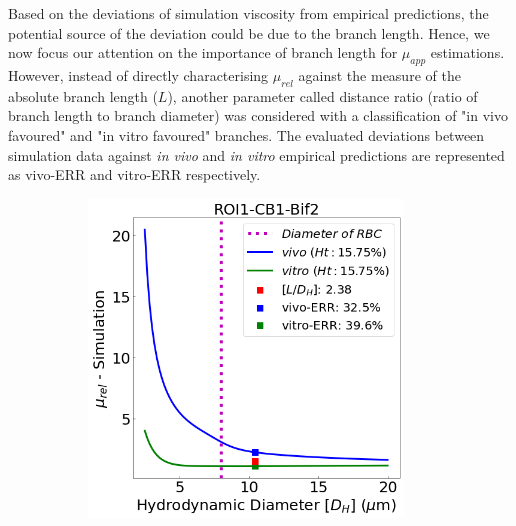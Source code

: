 \noindent Based on the deviations of simulation viscosity from empirical predictions, the potential source of the deviation could be due to the branch length. Hence, we now focus our attention on the importance of branch length for $\mu_{app}$ estimations. However, instead of directly characterising $\mu_{rel}$ against the measure of the absolute branch length ($L$), another parameter called distance ratio (ratio of branch length to branch diameter) was considered with a classification of "in vivo favoured" and "in vitro favoured" branches. The evaluated deviations between simulation data against \textit{in vivo} and \textit{in vitro} empirical predictions are represented as vivo-ERR and vitro-ERR respectively. 

\begin{figure}[H]
\centering
\begin{subfigure}{0.45 \textwidth}
    \includegraphics[width=0.92\textwidth]{images/DeviationsViscosity1.png}
    \caption{\textit{} \label{DeviationsViscosity1}}
\end{subfigure}
\hfill
\begin{subfigure}{0.45 \textwidth}

\end{subfigure}
\end{figure}
